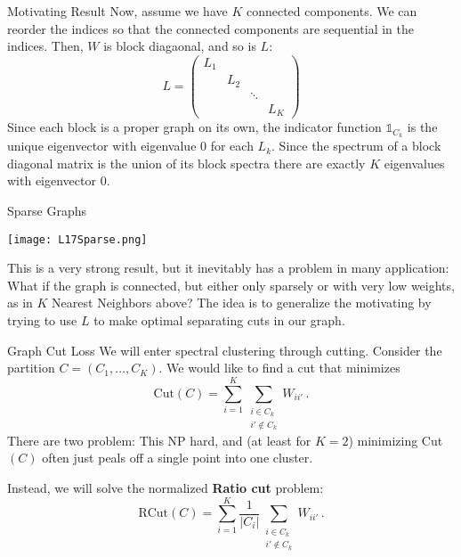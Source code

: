 \documentclass[10pt, table, dvipsnames,xcdraw, handout]{beamer}
\begin{document}
\begin{frame}[fragile]{Motivating Result}
Now, assume we have $K$ connected components. We can reorder the indices so that the connected components are sequential in the indices. Then, $W$ is block diagaonal, and so is $L$:
$$
L = \left(
\begin{matrix}
L_1&&&\\
&L_2&&\\
&&\ddots&\\
&&&L_K
\end{matrix}
\right)
$$\pause
Since each block is a proper graph on its own, the indicator function $\mathbb{1}_{C_k}$ is the unique eigenvector  with eigenvalue 0 for each $L_k$. Since the spectrum of a block diagonal matrix is the union of its block spectra there are exactly $K$ eigenvalues with eigenvector 0. 
\end{frame}





\begin{frame}[fragile]{Sparse Graphs}
  \begin{minipage}[t][0.6\textheight][t]{\textwidth}
	\centering \texttt{[image: L17Sparse.png]}
  \end{minipage}
  \vfill
\begin{minipage}[t][0.4\textheight][t]{\textwidth}
This is a very strong result, but it inevitably has a problem in many application: What if the graph is connected, but either only sparsely or with very low weights, as in $K$ Nearest Neighbors above? The idea is to generalize the motivating by trying to use $L$ to make optimal separating cuts in our graph. 
\end{minipage}
\end{frame}




\begin{frame}[fragile]{Graph Cut Loss}
We will enter spectral clustering through cutting. Consider the partition $C = (C_1,\ldots, C_K)$. We would like to find a cut that minimizes
$$
\text{Cut}(C) = \sum_{i=1}^K \sum_{\substack{i\in C_k \\ i'\not\in C_k}} W_{ii'}\,.
$$\pause
There are two problem: This NP hard, and (at least for $K=2$) minimizing Cut$(C)$ often just peals off a single point into one cluster. \pause 

Instead, we will solve the normalized \textbf{Ratio cut} problem:
$$
\text{RCut}(C) = \sum_{i=1}^K  \frac{1}{|C_i|} \sum_{\substack{i\in C_k \\ i'\not\in C_k}} W_{ii'}\,.
$$
\end{frame}
\end{document}

